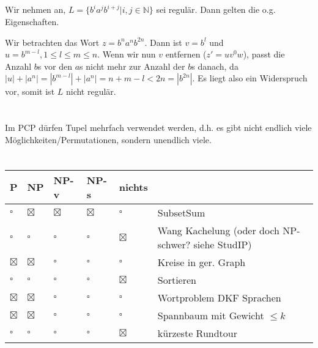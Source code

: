 \documentclass{article}
\begin{document}
\subsection{}%
Wir nehmen an, $L = \{b^ia^jb^{i+j} | i,j\in \mathbb{N}\}$ sei regulär. Dann gelten die o.g. Eigenschaften.

Wir betrachten das Wort $z = b^na^nb^{2n}$. Dann ist $v = b^l$ und $u = b^{m-l}, 1 \leq l \leq m \leq n$. Wenn wir nun $v$ entfernen ($z' = uv^0w$), passt die Anzahl $b$s vor den $a$s nicht mehr zur Anzahl der $b$s danach, da $|u|+|a^n| = |b^{m-l}|+|a^n| = n+m-l < 2n = |b^{2n}|$. Es liegt also ein Widerspruch vor, somit ist $L$ nicht regulär.

\section{}%
Im PCP dürfen Tupel mehrfach verwendet werden, d.h. es gibt nicht endlich viele Möglichkeiten/Permutationen, sondern unendlich viele.

\section{}%
\begin{center}
\begin{tabularx}{\textwidth}{lllll|X}
P & NP & NP-v & NP-s & nichts & \\
\hline
$\square$ & $\boxtimes$ & $\boxtimes$ & $\boxtimes$ & $\square$ & SubsetSum \\
$\square$ & $\square$ & $\square$ & $\square$ & $\boxtimes$ & Wang Kachelung (oder doch NP-schwer? siehe StudIP)\\
$\boxtimes$ & $\boxtimes$ & $\square$ & $\square$ & $\square$ & Kreise in ger. Graph \\
$\square$ & $\square$ & $\square$ & $\square$ & $\boxtimes$ & Sortieren \\
$\boxtimes$ & $\boxtimes$ & $\square$ & $\square$ & $\square$ & Wortproblem DKF Sprachen \\
$\boxtimes$ & $\boxtimes$ & $\square$ & $\square$ & $\square$ & Spannbaum mit Gewicht $\leq k$ \\
$\square$ & $\square$ & $\square$ & $\square$ & $\boxtimes$ & kürzeste Rundtour \\
\end{tabularx}
\end{center}

\section{}%
\end{document}
